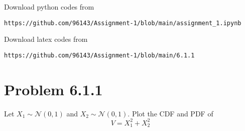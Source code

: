 \documentclass[journal,12pt,twocolumn]{IEEEtran}
\begin{document}
%
Download python codes from 
%
\begin{lstlisting}
https://github.com/96143/Assignment-1/blob/main/assignment_1.ipynb
\end{lstlisting}
%
Download latex codes from 
%
\begin{lstlisting}
https://github.com/96143/Assignment-1/blob/main/6.1.1
\end{lstlisting}
%
\section{Problem 6.1.1}

Let $X_1\sim \mathcal{N}(0,1)$ and $X_2\sim \mathcal{N}(0,1)$. Plot the
  CDF and PDF of
  \begin{equation*}
      V = X_1^2 + X_2^2
  \end{equation*}
\end{document}
